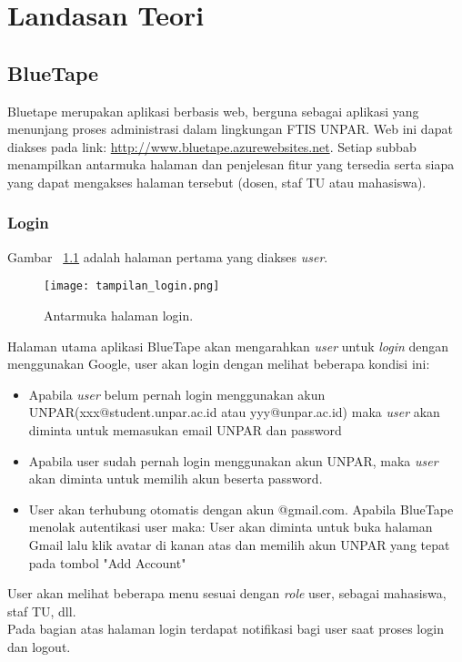 \chapter{Landasan Teori}

\section{BlueTape}
Bluetape merupakan aplikasi berbasis web, berguna sebagai aplikasi yang menunjang proses administrasi dalam lingkungan FTIS UNPAR. Web ini dapat diakses pada link: \url{http://www.bluetape.azurewebsites.net}. \cite{blueTape}
Setiap subbab menampilkan antarmuka halaman dan penjelesan fitur yang tersedia serta siapa yang dapat mengakses halaman tersebut (dosen, staf TU atau mahasiswa).

\subsection{Login}
\label{ss:login}
\noindent Gambar ~\ref{fig:tampilan_login} adalah halaman pertama yang diakses \textit{user}.
\begin{figure} [H]
	\centering  
	\texttt{[image: tampilan\_login.png]} 
	\caption{Antarmuka halaman login.} 
	\label{fig:tampilan_login}
\end{figure}
Halaman utama aplikasi BlueTape akan mengarahkan \textit{user} untuk \textit{login} dengan menggunakan Google, user akan login dengan melihat beberapa kondisi ini:
\begin{itemize}
	\item Apabila \textit{user} belum pernah login menggunakan akun UNPAR(xxx@student.unpar.ac.id atau yyy@unpar.ac.id) maka  \textit{user} akan diminta untuk memasukan email UNPAR dan password
	\item Apabila user sudah pernah login menggunakan akun UNPAR, maka \textit{user} akan diminta untuk memilih akun beserta password.
	\item User akan terhubung otomatis dengan akun @gmail.com. Apabila BlueTape menolak autentikasi user maka: User akan diminta untuk buka halaman Gmail lalu klik avatar di kanan atas dan memilih akun UNPAR yang tepat pada tombol "Add Account"
\end{itemize}
User akan melihat beberapa menu sesuai dengan \textit{role} user, sebagai mahasiswa, staf TU, dll.\\
\noindent Pada bagian atas halaman login terdapat notifikasi bagi user saat proses login dan logout. 

